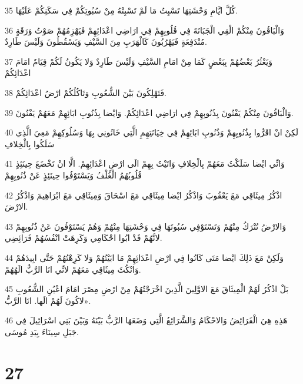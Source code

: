 \par 35 كُلَّ ايَّامِ وَحْشَتِهَا تَسْبِتُ مَا لَمْ تَسْبِتْهُ مِنْ سُبُوتِكُمْ فِي سَكَنِكُمْ عَلَيْهَا.
\par 36 وَالْبَاقُونَ مِنْكُمْ الْقِي الْجَبَانَةَ فِي قُلُوبِهِمْ فِي ارَاضِي اعْدَائِهِمْ فَيَهْزِمُهُمْ صَوْتُ وَرَقَةٍ مُنْدَفِعَةٍ فَيَهْرُبُونَ كَالْهَرَبِ مِنَ السَّيْفِ وَيَسْقُطُونَ وَلَيْسَ طَارِدٌ.
\par 37 وَيَعْثُرُ بَعْضُهُمْ بِبَعْضٍ كَمَا مِنْ امَامِ السَّيْفِ وَلَيْسَ طَارِدٌ وَلا يَكُونُ لَكُمْ قِيَامٌ امَامَ اعْدَائِكُمْ
\par 38 فَتَهْلِكُونَ بَيْنَ الشُّعُوبِ وَتَاكُلُكُمْ ارْضُ اعْدَائِكُمْ.
\par 39 وَالْبَاقُونَ مِنْكُمْ يَفْنُونَ بِذُنُوبِهِمْ فِي ارَاضِي اعْدَائِكُمْ. وَايْضا بِذُنُوبِ ابَائِهِمْ مَعَهُمْ يَفْنُونَ.
\par 40 لَكِنْ انْ اقَرُّوا بِذُنُوبِهِمْ وَذُنُوبِ ابَائِهِمْ فِي خِيَانَتِهِمِ الَّتِي خَانُونِي بِهَا وَسُلُوكِهِمْ مَعِيَ الَّذِي سَلَكُوا بِالْخِلافِ
\par 41 وَانِّي ايْضا سَلَكْتُ مَعَهُمْ بِالْخِلافِ وَاتَيْتُ بِهِمْ الَى ارْضِ اعْدَائِهِمْ. الَّا انْ تَخْضَعَ حِينَئِذٍ قُلُوبُهُمُ الْغُلْفُ وَيَسْتَوْفُوا حِينَئِذٍ عَنْ ذُنُوبِهِمْ
\par 42 اذْكُرُ مِيثَاقِي مَعَ يَعْقُوبَ وَاذْكُرُ ايْضا مِيثَاقِي مَعَ اسْحَاقَ وَمِيثَاقِي مَعَ ابْرَاهِيمَ وَاذْكُرُ الارْضَ.
\par 43 وَالارْضُ تُتْرَكُ مِنْهُمْ وَتَسْتَوْفِي سُبُوتَهَا فِي وَحْشَتِهَا مِنْهُمْ وَهُمْ يَسْتَوْفُونَ عَنْ ذُنُوبِهِمْ لانَّهُمْ قَدْ ابُوا احْكَامِي وَكَرِهَتْ انْفُسُهُمْ فَرَائِضِي.
\par 44 وَلَكِنْ مَعَ ذَلِكَ ايْضا مَتَى كَانُوا فِي ارْضِ اعْدَائِهِمْ مَا ابَيْتُهُمْ وَلا كَرِهْتُهُمْ حَتَّى ابِيدَهُمْ وَانْكُثَ مِيثَاقِي مَعَهُمْ لانِّي انَا الرَّبُّ الَهُهُمْ.
\par 45 بَلْ اذْكُرُ لَهُمْ الْمِيثَاقَ مَعَ الاوَّلِينَ الَّذِينَ اخْرَجْتُهُمْ مِنْ ارْضِ مِصْرَ امَامَ اعْيُنِ الشُّعُوبِ لاكُونَ لَهُمْ الَها. انَا الرَّبُّ».
\par 46 هَذِهِ هِيَ الْفَرَائِضُ وَالاحْكَامُ وَالشَّرَائِعُ الَّتِي وَضَعَهَا الرَّبُّ بَيْنَهُ وَبَيْنَ بَنِي اسْرَائِيلَ فِي جَبَلِ سِينَاءَ بِيَدِ مُوسَى.

\chapter{27}

